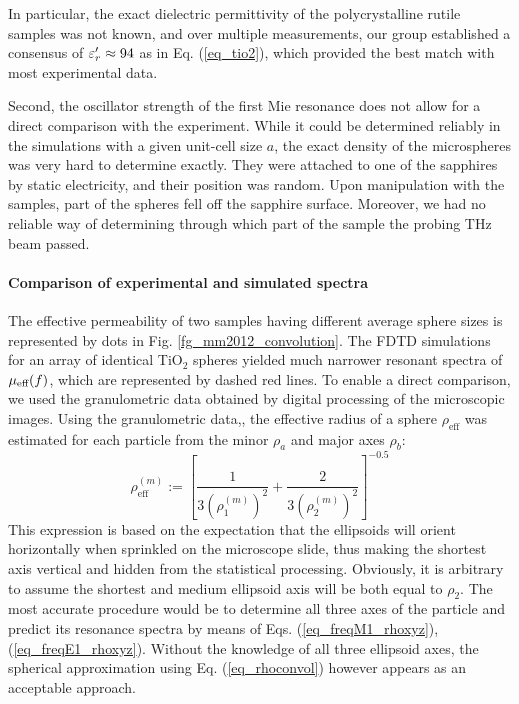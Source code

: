 In particular, the exact dielectric permittivity of the polycrystalline rutile samples was not known, and over multiple measurements, our group established a consensus of $\varepsilon_r' \approx 94$ as in Eq. (\ref{eq_tio2}), which provided the best match with most experimental data.

Second, the oscillator strength of the first Mie resonance does not allow for a direct comparison with the experiment. While it could be determined reliably in the simulations with a given unit-cell size $a$, the exact density of the microspheres was very hard to determine exactly. They were attached to one of the sapphires by static electricity, and their position was random. Upon manipulation with the samples, part of the spheres fell off the sapphire surface. Moreover, we had no reliable way of determining through which part of the sample the probing THz beam passed.

\paragraph{Comparison of experimental and simulated spectra}%
The effective permeability of two samples having different average sphere sizes is represented by dots in Fig. \ref{fg_mm2012_convolution}. The FDTD simulations for an array of identical TiO$_{2}$ spheres yielded much narrower resonant spectra of $\mu_{\text{eff} }(f)$, which are represented by dashed red lines. 
To enable a direct comparison, we used the granulometric data obtained by digital processing of the microscopic images. Using the granulometric data,, the effective radius of a sphere $\rho_{\text{eff}}$ was estimated for each particle from the minor $\rho_a$ and major axes $\rho_b$: 
\begin{equation} \rho_{\text{eff}}^{(m)} := \left[\frac{1}{3\left(\rho_1^{(m)}\right)^2} + \frac{2}{3\left(\rho_2^{(m)}\right)^2}\right]^{-0.5} \label{eq_rhoconvol}\end{equation}
This expression is based on the expectation that the ellipsoids will orient horizontally when sprinkled on the microscope slide, thus making the shortest axis vertical and hidden from the statistical processing. Obviously, it is arbitrary to assume the shortest and medium ellipsoid axis will be both equal to $\rho_2$. 
The most accurate procedure would be to determine all three axes of the particle and predict its resonance spectra by means of Eqs. (\ref{eq_freqM1_rhoxyz}), (\ref{eq_freqE1_rhoxyz}). Without the knowledge of all three ellipsoid axes, the spherical approximation using Eq. (\ref{eq_rhoconvol}) however appears as an acceptable approach.

